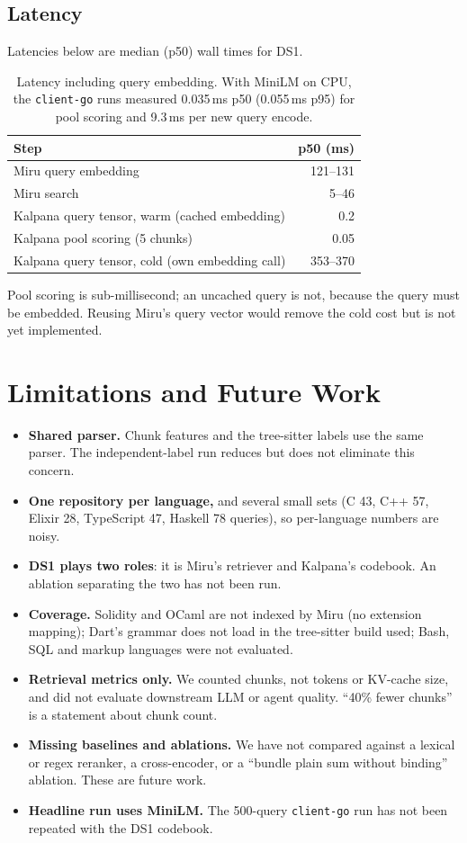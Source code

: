 \documentclass[11pt, a4paper]{article}
\begin{document}
\subsection{Latency}
Latencies below are median (p50) wall times for DS1.

\begin{table}[h]
\centering
\begin{tabular}{@{}lr@{}}
\toprule
\textbf{Step} & \textbf{p50 (ms)} \\ \midrule
Miru query embedding & 121--131 \\
Miru search & 5--46 \\
Kalpana query tensor, warm (cached embedding) & 0.2 \\
Kalpana pool scoring (5 chunks) & 0.05 \\
Kalpana query tensor, cold (own embedding call) & 353--370 \\ \bottomrule
\end{tabular}
\caption{Latency including query embedding. With MiniLM on CPU, the \texttt{client-go} runs measured 0.035\,ms p50 (0.055\,ms p95) for pool scoring and 9.3\,ms per new query encode.}
\end{table}

Pool scoring is sub-millisecond; an uncached query is not, because the query must be embedded. Reusing Miru's query vector would remove the cold cost but is not yet implemented.

\section{Limitations and Future Work}\label{sec:limits}
\begin{itemize}
\item \textbf{Shared parser.} Chunk features and the tree-sitter labels use the same parser. The independent-label run reduces but does not eliminate this concern.
\item \textbf{One repository per language,} and several small sets (C 43, C++ 57, Elixir 28, TypeScript 47, Haskell 78 queries), so per-language numbers are noisy.
\item \textbf{DS1 plays two roles}: it is Miru's retriever and Kalpana's codebook. An ablation separating the two has not been run.
\item \textbf{Coverage.} Solidity and OCaml are not indexed by Miru (no extension mapping); Dart's grammar does not load in the tree-sitter build used; Bash, SQL and markup languages were not evaluated.
\item \textbf{Retrieval metrics only.} We counted chunks, not tokens or KV-cache size, and did not evaluate downstream LLM or agent quality. ``40\% fewer chunks'' is a statement about chunk count.
\item \textbf{Missing baselines and ablations.} We have not compared against a lexical or regex reranker, a cross-encoder, or a ``bundle plain sum without binding'' ablation. These are future work.
\item \textbf{Headline run uses MiniLM.} The 500-query \texttt{client-go} run has not been repeated with the DS1 codebook.
\end{itemize}
\end{document}
